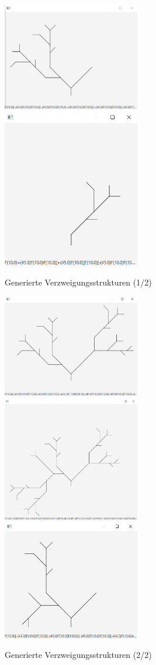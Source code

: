 \begin{figure}[H]
    \includegraphics[width=6cm]{../images/example_1.png}
    \includegraphics[width=6cm]{../images/example_2.png}
    \caption{Generierte Verzweigungsstrukturen (1/2)}
\end{figure}
\begin{figure}[H]
    \includegraphics[width=6cm]{../images/example_3.png}
    \includegraphics[width=6cm]{../images/example_4.png}
    \includegraphics[width=6cm]{../images/example_5.png}
    \caption{Generierte Verzweigungsstrukturen (2/2)}
\end{figure}

